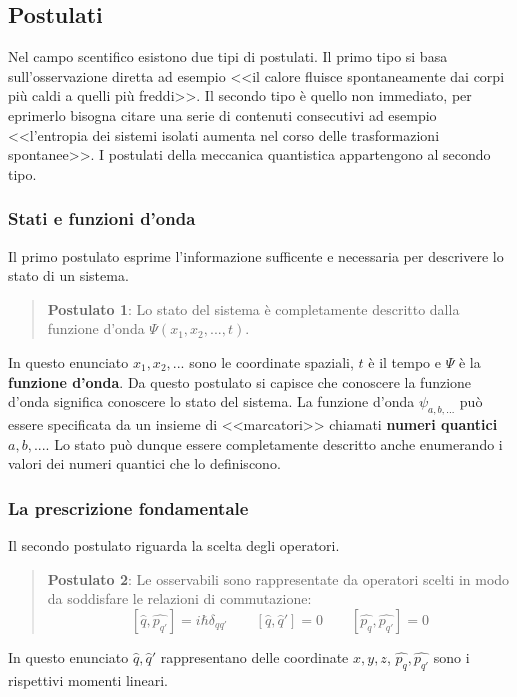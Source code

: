 \subsection{Postulati}
Nel campo scentifico esistono due tipi di postulati. Il primo tipo si basa sull'osservazione diretta ad esempio <<il calore fluisce spontaneamente dai corpi più caldi a quelli più freddi>>. Il secondo tipo è quello non immediato, per eprimerlo bisogna citare una serie di contenuti consecutivi ad esempio <<l'entropia dei sistemi isolati aumenta nel corso delle trasformazioni spontanee>>. I postulati della meccanica quantistica appartengono al secondo tipo.

\subsubsection{Stati e funzioni d'onda}
Il primo postulato esprime l'informazione sufficente e necessaria per descrivere lo stato di un sistema.
\begin{quote}
\textbf{Postulato 1}: Lo stato del sistema è completamente descritto dalla funzione d'onda $\Psi(x_1, x_2, ..., t)$.
\end{quote}
In questo enunciato $x_1, x_2, ...$ sono le coordinate spaziali, $t$ è il tempo e $\Psi$ è la \textbf{funzione d'onda}. Da questo postulato si capisce che conoscere la funzione d'onda significa conoscere lo stato del sistema. La funzione d'onda $\psi_{a, b, ...}$ può essere specificata da un insieme di <<marcatori>> chiamati \textbf{numeri quantici} $a, b, ...$. Lo stato può dunque essere completamente descritto anche enumerando i valori dei numeri quantici che lo definiscono.

\subsubsection{La prescrizione fondamentale}
Il secondo postulato riguarda la scelta degli operatori.
\begin{quote}
  \textbf{Postulato 2}: Le osservabili sono rappresentate da operatori scelti in modo da soddisfare le relazioni di commutazione:
  $$ [\hat{q}, \hat{p_{q'}}] = i \hbar \delta_{qq'} \qquad [\hat{q}, \hat{q}'] = 0 \qquad [\hat{p_q}, \hat{p_{q'}}] = 0$$
\end{quote}
In questo enunciato $\hat{q}, \hat{q}'$ rappresentano delle coordinate $x, y, z$, $\hat{p_q}, \hat{p_{q'}}$ sono i rispettivi momenti lineari.
